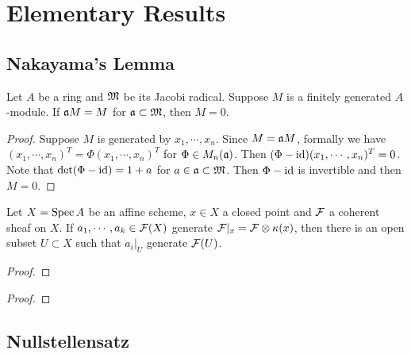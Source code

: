 \section{Elementary Results}

    \subsection{Nakayama's Lemma}

        \begin{theorem}\label{thm: Nakayama's lemma}
            Let $A$ be a ring and ${\mathfrak{M}}$ be its Jacobi radical.
            Suppose $M$ is a finitely generated $A$-module.
            If ${\mathfrak{a}} M = M$ for ${\mathfrak{a}} \subset {\mathfrak{M}}$, then $M = 0$.
        \end{theorem}
        \begin{proof}
            Suppose $M$ is generated by $x_1,\cdots,x_n$.
            Since $M = {\mathfrak{a}} M$, formally we have $(x_1,\cdots,x_n)^T = \Phi (x_1,\cdots, x_n)^T$ for $\Phi \in M_n({\mathfrak{a}})$.
            Then $(\Phi - {\operatorname{id}}) (x_1,\cdots, x_n)^T = 0$. 
            Note that $\det (\Phi - {\operatorname{id}}) = 1+a$ for $a \in {\mathfrak{a}} \subset {\mathfrak{M}}$.
            Then $\Phi-{\operatorname{id}}$ is invertible and then $M=0$.
        \end{proof}

        \begin{proposition}\label{prop: geometric form of Nakayama's lemma}
            Let $X = \operatorname{Spec} A$ be an affine scheme, $x\in X$ a closed point and ${\mathcal{F}}$ a coherent sheaf on $X$.
            If $a_1,\cdots,a_k \in {\mathcal{F}}(X)$ generate ${\mathcal{F}}|_x = {\mathcal{F}} \otimes {\kappa}(x)$, then there is an open subset $U \subset X$ such that $a_i|_U$ generate ${\mathcal{F}}(U)$. 
        \end{proposition}
        \begin{proof}
        \end{proof}

        \begin{corollary}\label{cor: upper semicontinuity of dim F|_y}
            
        \end{corollary}
        \begin{proof}
        \end{proof}

    \subsection{Nullstellensatz}

